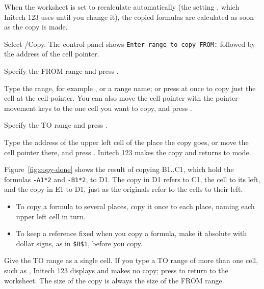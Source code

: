 When the worksheet is set to recalculate automatically (the setting
, which Initech 123 uses
until you change it), the copied formulas are calculated as soon as the
copy is made.

\begin{Steps123}
\item Select /Copy.  The control panel shows
  \texttt{Enter range to copy FROM:} followed by the address of the cell
  pointer.
\item Specify the FROM range and press .

  Type the range, for example , or a range name; or press
   at once to copy just the cell at the cell pointer.  You can
  also move the cell pointer with the pointer-movement keys to the one cell
  you want to copy, and press .
\item Specify the TO range and press .

  Type the address of the upper left cell of the place the copy goes, or
  move the cell pointer there, and press .  Initech 123 makes
  the copy and returns to  mode.
\end{Steps123}


Figure~\ref{fig:copy-done} shows the result of copying B1..C1, which hold
the formulas \texttt{-A1*2} and \texttt{-B1*2}, to D1.  The copy in D1
refers to C1, the cell to its left, and the copy in E1 to D1, just as the
originals refer to the cells to their left.

\begin{itemize}
\item To copy a formula to several places, copy it once to each place,
  naming each upper left cell in turn.
\item To keep a reference fixed when you copy a formula, make it absolute
  with dollar signs, as in \texttt{\$B\$1}, before you copy.
\end{itemize}

\begin{Note}
Give the TO range as a single cell.  If you type a TO range of more than one
cell, such as , Initech 123 displays
 and makes no copy; press
 to return to the worksheet.  The size of the copy is always the
size of the FROM range.
\end{Note}

